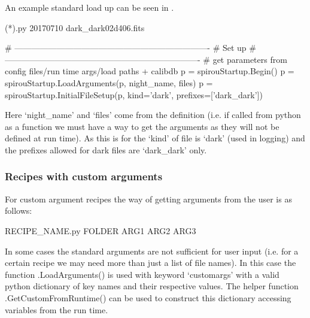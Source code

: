 An example standard load up can be seen in \calDARK.

\begin{cmdbox}
(*\calDARK*).py 20170710 dark_dark02d406.fits
\end{cmdbox}

\begin{pythonbox}
    # ----------------------------------------------------------------------
    # Set up
    # ----------------------------------------------------------------------
    # get parameters from config files/run time args/load paths + calibdb
    p = spirouStartup.Begin()
    p = spirouStartup.LoadArguments(p, night_name, files)
    p = spirouStartup.InitialFileSetup(p, kind='dark', prefixes=['dark_dark'])
\end{pythonbox}
\begin{note}
Here `night\_name' and `files' come from the \progMAIN definition (i.e. if called from python as a function we must have a way to get the arguments as they will not be defined at run time). As this is for \calDARK the `kind' of file is `dark' (used in logging) and the prefixes allowed for dark files are `dark\_dark' only.
\end{note}

\subsubsection{Recipes with custom arguments}
\label{ch:the_recipes:gen_layout:custom_arguments}

For custom argument recipes the way of getting arguments from the user is as follows:

\begin{cmdbox}
RECIPE_NAME.py FOLDER ARG1 ARG2 ARG3
\end{cmdbox}

In some cases the standard arguments are not sufficient for user input (i.e. for a certain recipe we may need more than just a list of file names). In this case the function \spirouStartup.LoadArguments() is used with keyword `customargs' with a valid python dictionary of key names and their respective values. The helper function \spirouStartup.GetCustomFromRuntime() can be used to construct this dictionary accessing variables from the run time. 

